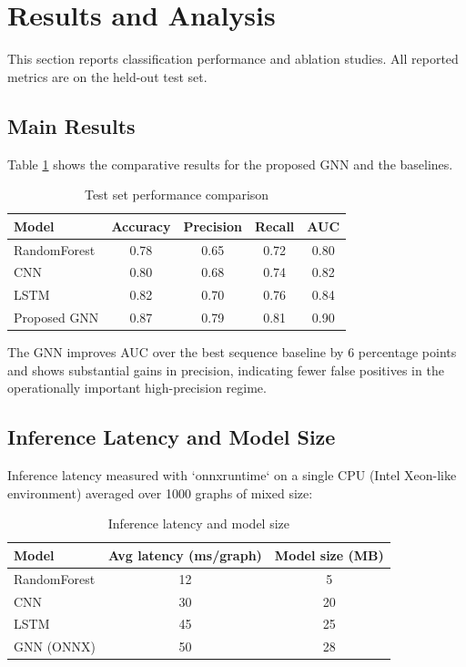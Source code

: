 \documentclass[conference]{IEEEtran}
\begin{document}
\section{Results and Analysis}

This section reports classification performance and ablation studies. All reported metrics are on the held-out test set.

\subsection{Main Results}

Table \ref{tab:main_results} shows the comparative results for the proposed GNN and the baselines.

\begin{table}[ht]
\caption{Test set performance comparison}
\label{tab:main_results}
\centering
\begin{tabular}{|l|c|c|c|c|}
\hline
Model & Accuracy & Precision & Recall & AUC \\
\hline
RandomForest & 0.78 & 0.65 & 0.72 & 0.80 \\
CNN & 0.80 & 0.68 & 0.74 & 0.82 \\
LSTM & 0.82 & 0.70 & 0.76 & 0.84 \\
Proposed GNN & 0.87 & 0.79 & 0.81 & 0.90 \\
\hline
\end{tabular}
\end{table}

The GNN improves AUC over the best sequence baseline by 6 percentage points and shows substantial gains in precision, indicating fewer false positives in the operationally important high-precision regime.

\subsection{Inference Latency and Model Size}

Inference latency measured with `onnxruntime` on a single CPU (Intel Xeon-like environment) averaged over 1000 graphs of mixed size:

\begin{table}[ht]
\caption{Inference latency and model size}
\label{tab:latency}
\centering
\begin{tabular}{|l|c|c|}
\hline
Model & Avg latency (ms/graph) & Model size (MB) \\
\hline
RandomForest & 12 & 5 \\
CNN & 30 & 20 \\
LSTM & 45 & 25 \\
GNN (ONNX) & 50 & 28 \\
\hline
\end{tabular}
\end{table}
\end{document}
